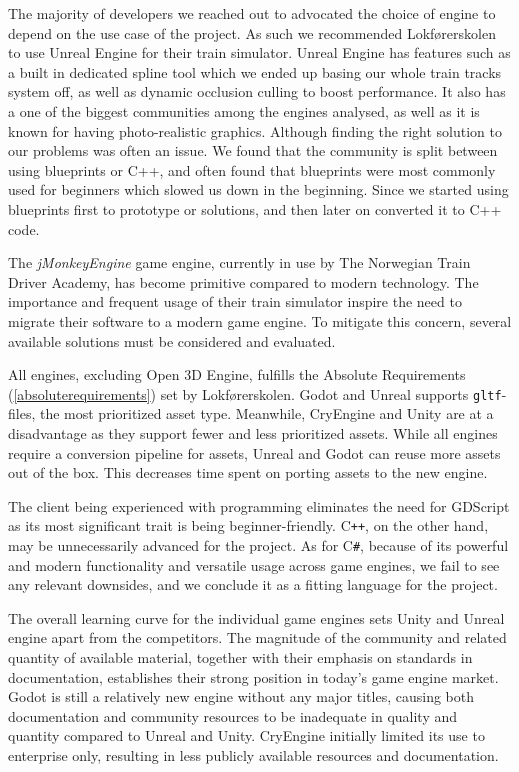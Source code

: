 The majority of developers we reached out to advocated the choice of engine to depend on the use case of the project. As such we recommended Lokførerskolen to use Unreal Engine for their train simulator. Unreal Engine has features such as a built in dedicated spline tool which we ended up basing our whole train tracks system off, as well as dynamic occlusion culling to boost performance. It also has a one of the biggest communities among the engines analysed, as well as it is known for having photo-realistic graphics. Although finding the right solution to our problems was often an issue. We found that the community is split between using blueprints or C++, and often found that blueprints were most commonly used for beginners which slowed us down in the beginning. Since we started using blueprints first to prototype or solutions, and then later on converted it to C++ code.




The \textit{jMonkeyEngine} game engine, currently in use by The Norwegian Train Driver Academy, has become primitive compared to modern technology. The importance and frequent usage of their train simulator inspire the need to migrate their software to a modern game engine. To mitigate this concern, several available solutions must be considered and evaluated.

All engines, excluding Open 3D Engine, fulfills the Absolute Requirements (\ref{absoluterequirements}) set by Lokførerskolen. Godot and Unreal supports \texttt{gltf}-files, the most prioritized asset type. Meanwhile, CryEngine and Unity are at a disadvantage as they support fewer and less prioritized assets. While all engines require a conversion pipeline for assets, Unreal and Godot can reuse more assets out of the box. This decreases time spent on porting assets to the new engine. 

The client being experienced with programming eliminates the need for GDScript as its most significant trait is being beginner-friendly. C\texttt{++}, on the other hand, may be unnecessarily advanced for the project. As for C\texttt{\#}, because of its powerful and modern functionality and versatile usage across game engines, we fail to see any relevant downsides, and we conclude it as a fitting language for the project.

The overall learning curve for the individual game engines sets Unity and Unreal engine apart from the competitors. The magnitude of the community and related quantity of available material, together with their emphasis on standards in documentation, establishes their strong position in today's game engine market. Godot is still a relatively new engine without any major titles, causing both documentation and community resources to be inadequate in quality and quantity compared to Unreal and Unity. CryEngine initially limited its use to enterprise only, resulting in less publicly available resources and documentation. 

